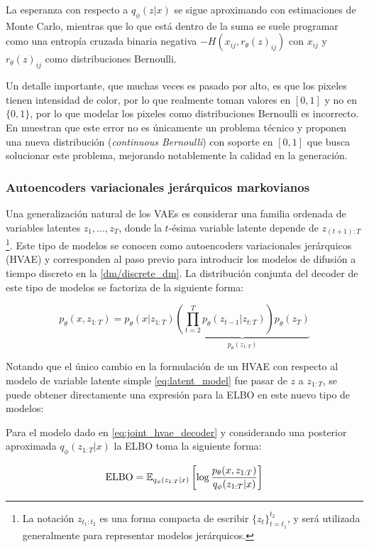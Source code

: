 La esperanza con respecto a $q_\phi(z|x)$ se sigue aproximando con estimaciones de Monte Carlo, mientras que lo que está dentro de la suma se suele programar como una entropía cruzada binaria negativa $-H(x_{ij},r_\theta(z)_{ij})$ con $x_{ij}$ y $r_\theta(z)_{ij}$ como distribuciones Bernoulli.

Un detalle importante, que muchas veces es pasado por alto, es que los pixeles tienen intensidad de color, por lo que realmente toman valores en $[0,1]$ y no en $\{0,1\}$, por lo que modelar los pixeles como distribuciones Bernoulli es incorrecto. En \cite{loaizaganem2019continuous} muestran que este error no es únicamente un problema técnico y proponen una nueva distribución (\textit{continuous Bernoulli}) con soporte en $[0,1]$ que busca solucionar este problema, mejorando notablemente la calidad en la generación.

\subsubsection{Autoencoders variacionales jerárquicos markovianos}

Una generalización natural de los VAEs es considerar una familia ordenada de variables latentes $z_1,\ldots,z_T$, donde la $t$-ésima variable latente depende de $z_{(t+1):T}$\footnote{La notación $z_{t_1:t_2}$ es una forma compacta de escribir $\{z_t\}_{t=t_1}^{t_2}$, y será utilizada generalmente para representar modelos jerárquicos.}. Este tipo de modelos se conocen como autoencoders variacionales jerárquicos (HVAE) y corresponden al paso previo para introducir los modelos de difusión a tiempo discreto en la \autoref{dm/discrete_dm}. La distribución conjunta del decoder de este tipo de modelos se factoriza de la siguiente forma:

\begin{equation}
    \label{eq:joint_hvae_decoder}
    p_\theta(x, z_{1:T})
    = p_\theta(x|z_{1:T})\underbrace{
        \left(\prod_{t=2}^{T} p_\theta(z_{t-1}|z_{t:T})\right)
        p_\theta(z_T)}_{p_\theta(z_{1:T})}
\end{equation}

Notando que el único cambio en la formulación de un HVAE con respecto al modelo de variable latente simple \eqref{eq:latent_model} fue pasar de $z$ a $z_{1:T}$, se puede obtener directamente una expresión para la ELBO en este nuevo tipo de modelos:

\begin{prop}
    Para el modelo dado en \eqref{eq:joint_hvae_decoder} y considerando una posterior aproximada $q_\phi(z_{1:T}|x)$ la ELBO toma la siguiente forma:

    \begin{equation}
        \label{eq:elbo_mhvae}
        \operatorname{ELBO}
        = \mathbb{E}_{q_\phi(z_{1:T}|x)}\left[\log\frac{p_\theta(x,z_{1:T})}{q_\phi(z_{1:T}|x)}\right]
    \end{equation}
\end{prop}

